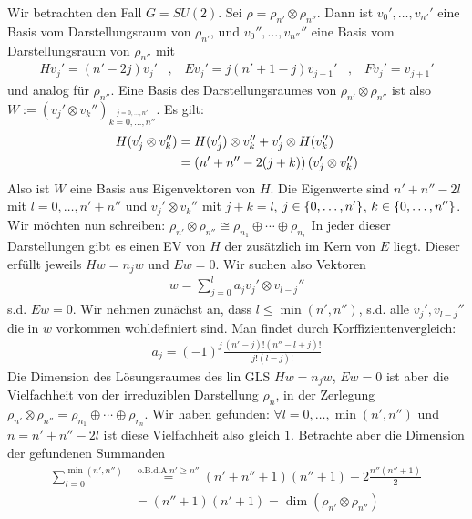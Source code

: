 Wir betrachten den Fall $G = SU(2)$. Sei $\rho = \rho_{n'} \otimes \rho_{n''}$.
Dann ist $v_0',\dots,v_{n'}'$ eine Basis vom Darstellungsraum von $\rho_{n'}$,
und $v_0'',\dots,v_{n''}''$ eine Basis vom Darstellungsraum von $\rho_{n''}$
mit
\begin{align*}
    H v_j' = (n' - 2j) v_j'
    \hspace{10pt} , \hspace{10pt}
    E v_j' = j(n' + 1 - j) v_{j-1}'
    \hspace{10pt} , \hspace{10pt}
    F v_j' = v_{j+1}'
\end{align*}
und analog für $\rho_{n''}$. Eine Basis des Darstellungsraumes von $\rho_{n'}
\otimes \rho_{n''}$ ist also $W := (v_j' \otimes v_k'')_{\stackrel{j=0,\dots,n'}{k=0,\dots,n''}}$.
Es gilt:
\begin{align*}
    H(v_j' \otimes v_k'')
    &= H(v_j') \otimes v_k'' + v_j' \otimes H(v_k'')
    \\
    &= \left( n' + n'' - 2(j+k) \right) (v_j' \otimes v_k'')
\end{align*}
Also ist $W$ eine Basis aus Eigenvektoren von $H$. Die Eigenwerte sind $n' +
n'' - 2l$ mit $l=0,\dots,n'+n''$ und $v_j' \otimes v_k''$ mit $j+k=l$,
$j \in \left\{ 0,\dots,n' \right\}$, $k \in \left\{ 0,\dots,n'' \right\}$.
Wir möchten nun schreiben: $\rho_{n'} \otimes \rho_{n''} \cong \rho_{n_1}
\oplus \dotsb \oplus \rho_{n_r}$ In jeder dieser Darstellungen gibt es einen
EV von $H$ der zusätzlich im Kern von $E$ liegt. Dieser erfüllt jeweils
$H w = n_j w$ und $E w = 0$. Wir suchen also Vektoren
\begin{align*}
    w=\sum_{j=0}^l a_j v_j' \otimes v_{l-j}''
\end{align*}
s.d. $E w = 0$. Wir nehmen zunächst an, dass $l \leq \min(n',n'')$, s.d. alle
$v_j',v_{l-j}''$ die in $w$ vorkommen wohldefiniert sind. Man findet durch
Korffizientenvergleich:
\begin{align*}
    a_j = (-1)^j \frac{(n'-j)! (n'' - l + j)!}{j! (l-j)!}
\end{align*}
Die Dimension des Lösungsraumes des lin GLS $H w = n_j w$, $E w = 0$ ist
aber die Vielfachheit von der irreduziblen Darstellung $\rho_n$, in der
Zerlegung $\rho_{n'} \otimes \rho_{n''} = \rho_{n_1} \oplus \dotsb \oplus
\rho_{r_n}$. Wir haben gefunden: $\forall l = 0,\dots,\min(n',n'')$
und $n=n'+n''-2l$ ist diese Vielfachheit also gleich $1$. Betrachte aber die
Dimension der gefundenen Summanden
\begin{align*}
    \sum_{l=0}^{\min(n',n'')}
    &\stackrel{\text{o.B.d.A} \ n' \geq n''}{=}
    (n' + n'' + 1)(n'' + 1) - 2 \frac{n'' (n'' + 1)}{2}
    \\
    &= (n'' + 1) (n' + 1)
    = \dim(\rho_{n'} \otimes \rho_{n''})
\end{align*}

